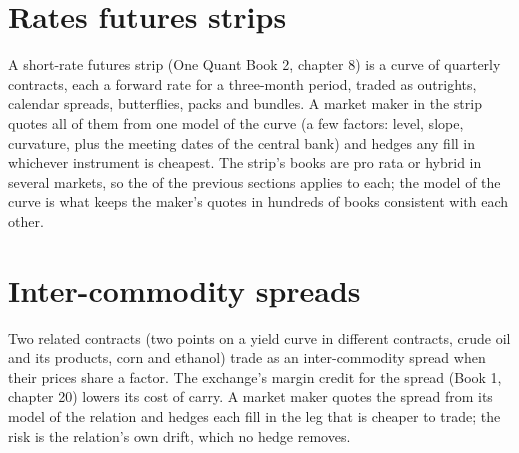 \begin{omfigure}

\label{fig:hf:futures-market-making:implied}
\end{omfigure}

\section{Rates futures strips}

A short-rate futures strip (One Quant Book 2, chapter 8) is a curve of quarterly contracts, each a forward rate for a three-month period, traded
as outrights, calendar spreads, butterflies, packs and bundles. A market maker in the strip quotes all of them from one model of the curve (a few
factors: level, slope, curvature, plus the meeting dates of the central bank) and hedges any fill in whichever instrument is cheapest. The strip's
books are pro rata or hybrid in several markets, so the  of the previous sections applies to each; the model of the curve is what keeps
the maker's quotes in hundreds of books consistent with each other.

\section{Inter-commodity spreads}

Two related contracts (two points on a yield curve in different contracts, crude oil and its products, corn and ethanol) trade as an
inter-commodity spread when their prices share a factor. The exchange's margin credit for the spread (Book 1, chapter 20) lowers its cost of
carry. A market maker quotes the spread from its model of the relation and hedges each fill in the leg that is cheaper to trade; the risk is the
relation's own drift, which no hedge removes.

